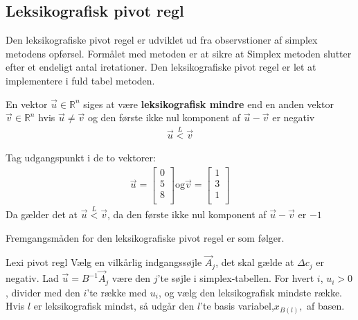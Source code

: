 \subsection{Leksikografisk pivot regl}
Den leksikografiske pivot regel er udviklet ud fra observstioner af simplex metodens opførsel. Formålet med metoden er at sikre at Simplex metoden slutter efter et endeligt antal iretationer. Den leksikografiske pivot regel er let at implementere i fuld tabel metoden. 
\begin{defn}
En vektor $\vec{u} \in \mathds{R}^n$ siges at være \textbf{leksikografisk mindre} end en anden vektor $\vec{v} \in \mathds{R}^n$ hvis $\vec{u} \neq \vec{v}$ og den første ikke nul komponent af $\vec{u}-\vec{v}$ er negativ 
\begin{align*}
\vec{u} \overset{L}{<} \vec{v}
\end{align*}
\end{defn}
\begin{eks}
Tag udgangspunkt i de to vektorer: 
\begin{align*}
\vec{u}=
\begin{bmatrix}
0\\
5\\
8\\
\end{bmatrix}
\text{og}
\vec{v}= 
\begin{bmatrix}
1\\
3\\
1\\
\end{bmatrix}
\end{align*}
Da gælder det at $\vec{u} \overset{L}{<} \vec{v}$, da den første ikke nul komponent af $\vec{u}-\vec{v}$ er $-1$
\end{eks}

Fremgangsmåden for den leksikografiske pivot regel er som følger.
  
\begin{pro}{Lexi pivot regl}
Vælg en vilkårlig indgangssøjle $\vec{A}_j$, det skal gælde at $\Delta c_j$ er negativ. Lad $\vec{u}=B^{-1}\vec{A}_j$ være den $j$'te søjle i simplex-tabellen.
For hvert $i$, $u_i>0$, divider med den $i$'te række med $u_i$, og vælg den leksikografisk mindste række. Hvis $l$ er leksikografisk mindst, så udgår den $l$'te basis variabel,$x_{B(l)},$ af basen. 
\end{pro}

